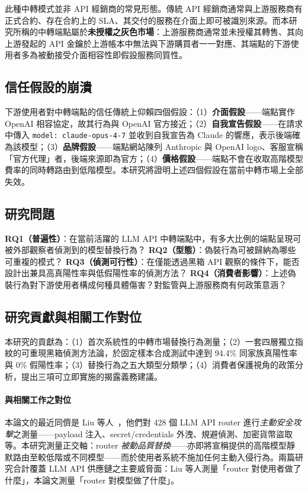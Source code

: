 \documentclass[UTF8,fontset=none,10pt,a4paper,twocolumn]{ctexart}
\begin{document}
此種中轉模式並非 API 經銷商的常見形態。傳統 API 經銷商通常與上游服務商有正式合約、存在合約上的 SLA、其交付的服務在介面上即可被識別來源。而本研究所稱的中轉端點屬於\textbf{未授權之灰色市場}：上游服務商通常並未授權其轉售、其向上游發起的 API 金鑰於上游帳本中無法與下游購買者一一對應、其端點的下游使用者多為被動接受介面相容性即假設服務同質性。

\subsection{信任假設的崩潰}
下游使用者對中轉端點的信任傳統上仰賴四個假設：（1）\textbf{介面假設}——端點實作 OpenAI 相容協定，故其行為與 OpenAI 官方接近；（2）\textbf{自我宣告假設}——在請求中傳入 \texttt{model: claude-opus-4-7} 並收到自我宣告為 Claude 的響應，表示後端確為該模型；（3）\textbf{品牌假設}——端點網站陳列 Anthropic 與 OpenAI logo、客服宣稱「官方代理」者，後端來源即為官方；（4）\textbf{價格假設}——端點不會在收取高階模型費率的同時轉路由到低階模型。本研究將證明上述四個假設在當前中轉市場上全部失效。

\subsection{研究問題}
\textbf{RQ1（普遍性）}：在當前活躍的 LLM API 中轉端點中，有多大比例的端點呈現可被外部觀察者偵測到的模型替換行為？
\textbf{RQ2（型態）}：偽裝行為可被歸納為哪些可重複的模式？
\textbf{RQ3（偵測可行性）}：在僅能透過黑箱 API 觀察的條件下，能否設計出兼具高真陽性率與低假陽性率的偵測方法？
\textbf{RQ4（消費者影響）}：上述偽裝行為對下游使用者構成何種具體傷害？對監管與上游服務商有何政策意涵？

\subsection{研究貢獻與相關工作對位}
本研究的貢獻為：（1）首次系統性的中轉市場替換行為測量；（2）一套四層獨立指紋的可重現黑箱偵測方法論，於固定樣本合成測試中達到 94.4\% 同家族真陽性率與 0\% 假陽性率；（3）替換行為之五大類型分類學；（4）消費者保護視角的政策分析，提出三項可立即實施的揭露義務建議。

\paragraph{與相關工作之對位}
本論文的最近同儕是 Liu 等人~\cite{liu2026agent}，他們對 428 個 LLM API router 進行\emph{主動安全攻擊}之測量——payload 注入、secret/credentials 外洩、規避偵測、加密貨幣盜取等。本研究測量正交軸：router \emph{被動品質替換}——亦即將宣稱提供的高階模型靜默路由至較低階或不同模型——而於使用者系統不施加任何主動入侵行為。兩篇研究合計覆蓋 LLM API 供應鏈之主要威脅面：Liu 等人測量「router 對使用者做了什麼」，本論文測量「router 對模型做了什麼」。
\end{document}
